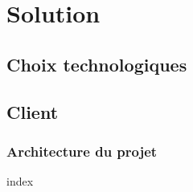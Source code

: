 \chapter{Solution}

\section{Choix technologiques}

\section{Client}
\subsection{Architecture du projet}

%
{index}

